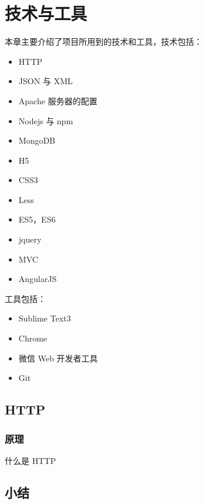\documentclass[UTF8]{ctexbook}
\begin{document}
  \chapter{技术与工具}
    \label{chap:技术与工具}
    本章主要介绍了项目所用到的技术和工具，技术包括：
    \begin{itemize}
      \item HTTP
      \item JSON 与 XML
      \item Apache 服务器的配置
      \item Nodejs 与 npm
      \item MongoDB
      \item H5
      \item CSS3
      \item Less
      \item ES5，ES6
      \item jquery
      \item MVC
      \item AngularJS
    \end{itemize}

    工具包括：

    \begin{itemize}
      \item Sublime Text3
      \item Chrome
      \item 微信 Web 开发者工具
      \item Git
    \end{itemize}

    \section{HTTP}
      \label{sec:http}
      \subsection{原理}
        \label{subsec:原理}


      什么是 HTTP

    \section{小结}
      \label{sec:小结}
\end{document}
